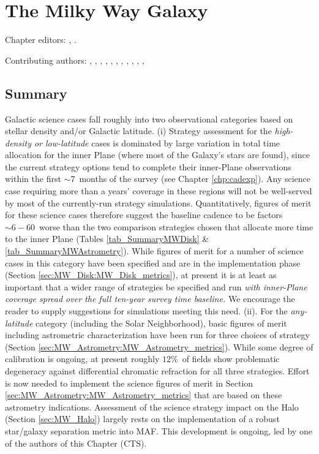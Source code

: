 
\chapter[The Milky Way Galaxy]{The Milky Way Galaxy}
\def\chpname{galaxy}\label{chp:\chpname}

Chapter editors:
,
.

Contributing authors:
,
,
,
,
,
,
,
,
,
,
,

\section*{Summary}

Galactic science cases fall roughly into two observational categories
based on stellar density and/or Galactic latitude. (i) Strategy
assessment for the {\it high-density or low-latitude} cases is dominated
by large variation in total time allocation for the inner Plane (where
most of the Galaxy's stars are found), since the current strategy
options tend to complete their inner-Plane observations within the first
$\sim 7$~months of the survey (see Chapter \ref{chp:cadexp}). Any
science case requiring more than a years' coverage in these regions will
not be well-served by most of the currently-run strategy simulations.
Quantitatively, figures of merit for these science cases therefore
suggest the baseline cadence to be factors $\sim 6-60$~worse than the
two comparison strategies chosen that allocate more time to the inner
Plane (Tables \ref{tab_SummaryMWDisk} \& \ref{tab_SummaryMWAstrometry}).
While figures of merit for a number of science cases in this category
have been specified and are in the implementation phase (Section
\ref{sec:MW_Disk:MW_Disk_metrics}), at present it is at least as
important that a wider range of strategies be specified and run {\it
with inner-Plane coverage spread over the full ten-year survey time
baseline.} We encourage the reader to supply suggestions for simulations
meeting this need. (ii). For the {\it any-latitude} category (including
the Solar Neighborhood), basic figures of merit including astrometric
characterization have been run for three choices of strategy (Section
\ref{sec:MW_Astrometry:MW_Astrometry_metrics}). While some degree of
calibration is ongoing, at present roughly $12\%$~of fields show
problematic degeneracy against differential chromatic refraction for all
three strategies. Effort is now needed to implement the science figures
of merit in Section \ref{sec:MW_Astrometry:MW_Astrometry_metrics} that
are based on these astrometry indications. Assessment of the science
strategy impact on the Halo (Section \ref{sec:MW_Halo}) largely rests on
the implementation of a robust star/galaxy separation metric into MAF.
This development is ongoing, led by one of the authors of this Chapter
(CTS).



